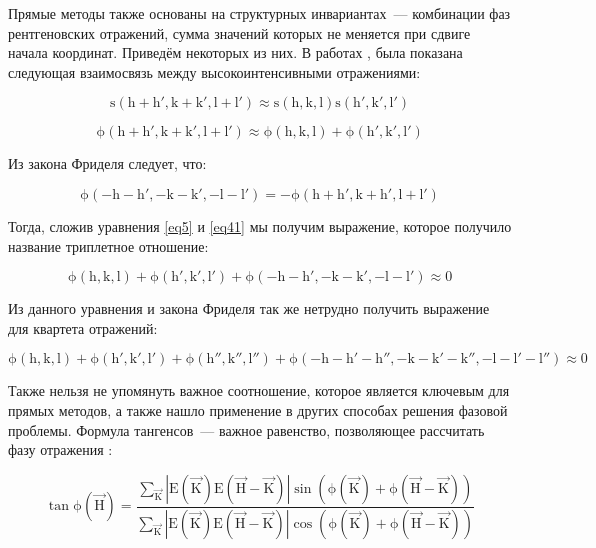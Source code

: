 Прямые методы также основаны на структурных инвариантах~--- комбинации фаз рентгеновских отражений, сумма значений которых не меняется при сдвиге начала координат. Приведём некоторых из них. В работах \cite{sayre_squaring_1952}, \cite{cochran_relation_1952} была показана следующая взаимосвязь между высокоинтенсивными отражениями:

\begin{equation}\label{eq4}
\mathrm{ 
s(h+h', k+k', l+l') \approx s(h,k,l) s(h', k', l')}
\end{equation}


\begin{equation}\label{eq41}
\mathrm{
\phi(h+h', k+k', l+l')\approx \phi(h,k,l)+\phi(h',k',l')
}
\end{equation}

Из закона Фриделя следует, что:

\begin{equation}\label{eq5}
\mathrm{ 
\phi(-h-h',-k-k',-l-l') = -\phi(h+h', k+h', l+l')}
\end{equation}

Тогда, сложив уравнения \ref{eq5} и \ref{eq41} мы получим выражение, которое получило название триплетное отношение:

\begin{equation}\label{eq6}
\mathrm{ 
\phi(h,k,l)+\phi(h',k',l') +\phi(-h-h',-k-k',-l-l')\approx 0}
\end{equation}

Из данного уравнения и закона Фриделя так же нетрудно получить выражение для квартета отражений:

\begin{equation}\label{eq7}
\mathrm{ 
\phi(h,k,l)+\phi(h',k',l') +\phi(h'',k'',l'')+\phi(-h-h'-h'',-k-k'-k'',-l-l'-l'')\approx 0}
\end{equation}

Также нельзя не упомянуть важное соотношение, которое является ключевым для прямых методов, а также нашло применение в других способах решения фазовой проблемы. Формула тангенсов~--- важное равенство, позволяющее рассчитать фазу отражения \cite{karle_symbolic_1966}: 
 
 \begin{equation}\label{sigma2}
 	\mathrm{\tan\phi(\overrightarrow{H}) = \frac{\sum\limits_{\overrightarrow{K}}|E(\overrightarrow{K})E(\overrightarrow{H}-\overrightarrow{K})|\sin(\phi(\overrightarrow{K})+\phi(\overrightarrow{H}-\overrightarrow{K}))}{\sum\limits_{\overrightarrow{K}}|E(\overrightarrow{K})E(\overrightarrow{H}-\overrightarrow{K})|\cos(\phi(\overrightarrow{K})+\phi(\overrightarrow{H}-\overrightarrow{K}))}
 	}
 \end{equation}

